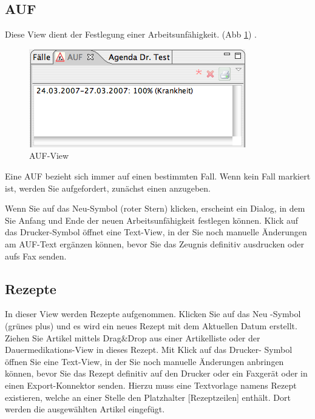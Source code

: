 \subsection{AUF}
Diese View dient der Festlegung einer Arbeitsunfähigkeit. (Abb \ref{fig:auf})
 . 
\begin{figure}
  \includegraphics{images/aufview}
  \caption{AUF-View}
  \label{fig:auf}
\end{figure}
Eine AUF bezieht sich immer auf einen bestimmten Fall. Wenn kein Fall markiert
ist, werden Sie aufgefordert, zunächst einen anzugeben.

Wenn Sie auf das \glqq Neu\grqq -Symbol (roter Stern) klicken, erscheint ein
Dialog, in dem Sie Anfang und Ende der neuen Arbeitsunfähigkeit festlegen
können. Klick auf das \glqq Drucker\grqq -Symbol öffnet eine Text-View, in der
Sie noch manuelle Änderungen am AUF-Text ergänzen können, bevor Sie das Zeugnis
definitiv ausdrucken oder aufs Fax senden.

\subsection{Rezepte}
In dieser View werden Rezepte aufgenommen. Klicken Sie auf das \glqq Neu\grqq
-Symbol (grünes plus) und es wird ein neues Rezept mit dem Aktuellen Datum
erstellt. Ziehen Sie Artikel mittels Drag\&Drop aus einer Artikelliste oder der
Dauermedikations-View in dieses Rezept. Mit Klick auf das \glqq Drucker\grqq -
Symbol öffnen Sie eine Text-View, in der Sie noch manuelle Änderungen anbringen
können, bevor Sie das Rezept definitiv auf den Drucker oder ein Faxgerät oder in
einen Export-Konnektor senden.
Hierzu muss eine Textvorlage namens \glqq Rezept\grqq
existieren, welche an einer Stelle den Platzhalter [Rezeptzeilen] enthält. Dort
werden die ausgewählten Artikel eingefügt.

